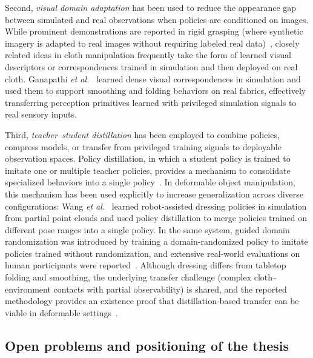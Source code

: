 Second, \emph{visual domain adaptation} has been used to reduce the appearance gap between simulated and real observations when policies are conditioned on images. While prominent demonstrations are reported in rigid grasping (where synthetic imagery is adapted to real images without requiring labeled real data)~\cite{Bousmalis2018SimDomainAdaptGrasp}, closely related ideas in cloth manipulation frequently take the form of learned visual descriptors or correspondences trained in simulation and then deployed on real cloth. Ganapathi \emph{et al.}~\cite{Ganapathi2021DenseCorrespondence} learned dense visual correspondences in simulation and used them to support smoothing and folding behaviors on real fabrics, effectively transferring perception primitives learned with privileged simulation signals to real sensory inputs.

Third, \emph{teacher--student distillation} has been employed to combine policies, compress models, or transfer from privileged training signals to deployable observation spaces. Policy distillation, in which a student policy is trained to imitate one or multiple teacher policies, provides a mechanism to consolidate specialized behaviors into a single policy~\cite{Rusu2015PolicyDistillation}. In deformable object manipulation, this mechanism has been used explicitly to increase generalization across diverse configurations: Wang \emph{et al.}~\cite{Wang2023OnePolicyDress} learned robot-assisted dressing policies in simulation from partial point clouds and used policy distillation to merge policies trained on different pose ranges into a single policy. In the same system, guided domain randomization was introduced by training a domain-randomized policy to imitate policies trained without randomization, and extensive real-world evaluations on human participants were reported~\cite{Wang2023OnePolicyDress}. Although dressing differs from tabletop folding and smoothing, the underlying transfer challenge (complex cloth--environment contacts with partial observability) is shared, and the reported methodology provides an existence proof that distillation-based transfer can be viable in deformable settings~\cite{Wang2023OnePolicyDress}.

\subsection{Open problems and positioning of the thesis}


